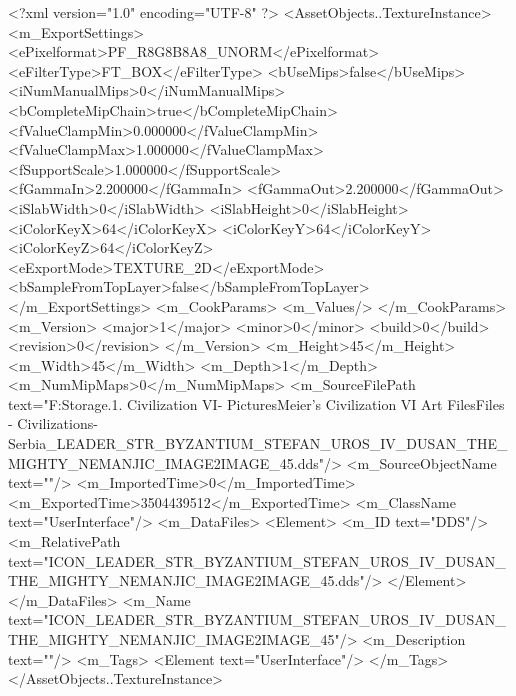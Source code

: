 <?xml version="1.0" encoding="UTF-8" ?>
<AssetObjects..TextureInstance>
	<m_ExportSettings>
		<ePixelformat>PF_R8G8B8A8_UNORM</ePixelformat>
		<eFilterType>FT_BOX</eFilterType>
		<bUseMips>false</bUseMips>
		<iNumManualMips>0</iNumManualMips>
		<bCompleteMipChain>true</bCompleteMipChain>
		<fValueClampMin>0.000000</fValueClampMin>
		<fValueClampMax>1.000000</fValueClampMax>
		<fSupportScale>1.000000</fSupportScale>
		<fGammaIn>2.200000</fGammaIn>
		<fGammaOut>2.200000</fGammaOut>
		<iSlabWidth>0</iSlabWidth>
		<iSlabHeight>0</iSlabHeight>
		<iColorKeyX>64</iColorKeyX>
		<iColorKeyY>64</iColorKeyY>
		<iColorKeyZ>64</iColorKeyZ>
		<eExportMode>TEXTURE_2D</eExportMode>
		<bSampleFromTopLayer>false</bSampleFromTopLayer>
	</m_ExportSettings>
	<m_CookParams>
		<m_Values/>
	</m_CookParams>
	<m_Version>
		<major>1</major>
		<minor>0</minor>
		<build>0</build>
		<revision>0</revision>
	</m_Version>
	<m_Height>45</m_Height>
	<m_Width>45</m_Width>
	<m_Depth>1</m_Depth>
	<m_NumMipMaps>0</m_NumMipMaps>
	<m_SourceFilePath text="F:\Mod Storage\2.1. Civilization VI\Mods\Archive - Pictures\Sid Meier's Civilization VI Art Files\Art Files - Civilizations\Civilization - Serbia\ICON_LEADER_STR_BYZANTIUM_STEFAN_UROS_IV_DUSAN_THE_MIGHTY_NEMANJIC_IMAGE2IMAGE_45.dds"/>
	<m_SourceObjectName text=""/>
	<m_ImportedTime>0</m_ImportedTime>
	<m_ExportedTime>3504439512</m_ExportedTime>
	<m_ClassName text="UserInterface"/>
	<m_DataFiles>
		<Element>
			<m_ID text="DDS"/>
			<m_RelativePath text="ICON_LEADER_STR_BYZANTIUM_STEFAN_UROS_IV_DUSAN_THE_MIGHTY_NEMANJIC_IMAGE2IMAGE_45.dds"/>
		</Element>
	</m_DataFiles>
	<m_Name text="ICON_LEADER_STR_BYZANTIUM_STEFAN_UROS_IV_DUSAN_THE_MIGHTY_NEMANJIC_IMAGE2IMAGE_45"/>
	<m_Description text=""/>
	<m_Tags>
		<Element text="UserInterface"/>
	</m_Tags>
</AssetObjects..TextureInstance>

